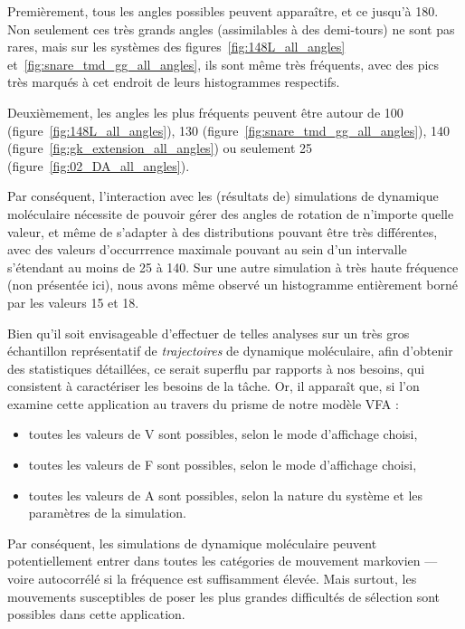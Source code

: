 	Premièrement, tous les angles possibles peuvent apparaître, et ce jusqu'à 180\textdegree{}. Non seulement ces très grands angles (assimilables à des demi-tours) ne sont pas rares, mais sur les systèmes des figures~\ref{fig:148L_all_angles} et~\ref{fig:snare_tmd_gg_all_angles}, ils sont même très fréquents, avec des pics très marqués à cet endroit de leurs histogrammes respectifs.
	
	Deuxièmement, les angles les plus fréquents peuvent être autour de 100\textdegree{} (figure~\ref{fig:148L_all_angles}), 130\textdegree{} (figure~\ref{fig:snare_tmd_gg_all_angles}), 140\textdegree{} (figure~\ref{fig:gk_extension_all_angles}) ou seulement 25\textdegree{} (figure~\ref{fig:02_DA_all_angles}).
	
	Par conséquent, l'interaction avec les (résultats de) simulations de dynamique moléculaire nécessite de pouvoir gérer des angles de rotation de n'importe quelle valeur, et même de s'adapter à des distributions pouvant être très différentes, avec des valeurs d'occurrrence maximale pouvant au sein d'un intervalle s'étendant au moins de 25\textdegree{} à 140\textdegree{}. Sur une autre simulation à très haute fréquence (non présentée ici), nous avons même observé un histogramme entièrement borné par les valeurs 15\textdegree{} et 18\textdegree{}.
	
	Bien qu'il soit envisageable d'effectuer de telles analyses sur un très gros échantillon représentatif de \emph{trajectoires} de dynamique moléculaire, afin d'obtenir des statistiques détaillées, ce serait superflu par rapports à nos besoins, qui consistent à caractériser les besoins de la tâche. Or, il apparaît que, si l'on examine cette application au travers du prisme de notre modèle VFA :
	
	\begin{itemize}
		\item toutes les valeurs de V sont possibles, selon le mode d'affichage choisi,
		\item toutes les valeurs de F sont possibles, selon le mode d'affichage choisi,
		\item toutes les valeurs de A sont possibles, selon la nature du système et les paramètres de la simulation.
	\end{itemize}
	
	Par conséquent, les simulations de dynamique moléculaire peuvent potentiellement entrer dans toutes les catégories de mouvement markovien --- voire autocorrélé si la fréquence est suffisamment élevée. Mais surtout, les mouvements susceptibles de poser les plus grandes difficultés de sélection sont possibles dans cette application.
	

